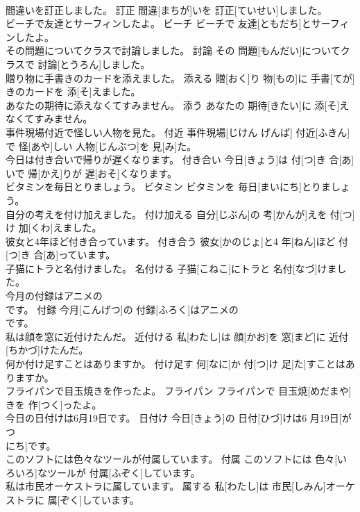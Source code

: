 \documentclass[8pt]{extreport}
\begin{document}
\begin{CJK}{UTF8}{min}
\\	間違いを訂正しました。	訂正	間違[まちが]いを 訂正[ていせい]しました。	
\\	ビーチで友達とサーフィンしたよ。	ビーチ	ビーチで 友達[ともだち]とサーフィンしたよ。	
\\	その問題についてクラスで討論しました。	討論	その 問題[もんだい]についてクラスで 討論[とうろん]しました。	
\\	贈り物に手書きのカードを添えました。	添える	贈[おく]り 物[もの]に 手書[てが]きのカードを 添[そ]えました。	
\\	あなたの期待に添えなくてすみません。	添う	あなたの 期待[きたい]に 添[そ]えなくてすみません。	
\\	事件現場付近で怪しい人物を見た。	付近	事件現場[じけん げんば] 付近[ふきん]で 怪[あや]しい 人物[じんぶつ]を 見[み]た。	
\\	今日は付き合いで帰りが遅くなります。	付き合い	今日[きょう]は 付[つ]き 合[あ]いで 帰[かえ]りが 遅[おそ]くなります。	
\\	ビタミンを毎日とりましょう。	ビタミン	ビタミンを 毎日[まいにち]とりましょう。	
\\	自分の考えを付け加えました。	付け加える	自分[じぶん]の 考[かんが]えを 付[つ]け 加[くわ]えました。	
\\	彼女と4年ほど付き合っています。	付き合う	彼女[かのじょ]と4 年[ねん]ほど 付[つ]き 合[あ]っています。	
\\	子猫にトラと名付けました。	名付ける	子猫[こねこ]にトラと 名付[なづ]けました。	
\\	今月の付録はアニメの
\\	です。	付録	今月[こんげつ]の 付録[ふろく]はアニメの 
\\	[でぃーぶぃーでぃー]です。	
\\	私は顔を窓に近付けたんだ。	近付ける	私[わたし]は 顔[かお]を 窓[まど]に 近付[ちかづ]けたんだ。	
\\	何か付け足すことはありますか。	付け足す	何[なに]か 付[つ]け 足[た]すことはありますか。	
\\	フライパンで目玉焼きを作ったよ。	フライパン	フライパンで 目玉焼[めだまや]きを 作[つく]ったよ。	
\\	今日の日付けは6月19日です。	日付け	今日[きょう]の 日付[ひづ]けは6 月19日[がつ 
\\	にち]です。	
\\	このソフトには色々なツールが付属しています。	付属	このソフトには 色々[いろいろ]なツールが 付属[ふぞく]しています。	
\\	私は市民オーケストラに属しています。	属する	私[わたし]は 市民[しみん]オーケストラに 属[ぞく]しています。	

\end{CJK}
\end{document}
